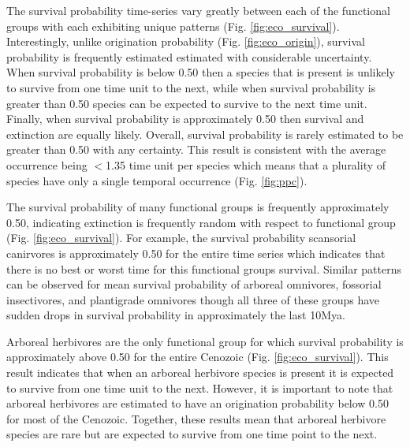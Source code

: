 \documentclass[12pt,letterpaper]{article}
\begin{document}
The survival probability time-series vary greatly between each of the functional groups with each exhibiting unique patterns (Fig. \ref{fig:eco_survival}). Interestingly, unlike origination probability (Fig. \ref{fig:eco_origin}), survival probability is frequently estimated estimated with considerable uncertainty. When survival probability is below 0.50 then a species that is present is unlikely to survive from one time unit to the next, while when survival probability is greater than 0.50 species can be expected to survive to the next time unit. Finally, when survival probability is approximately 0.50 then survival and extinction are equally likely. Overall, survival probability is rarely estimated to be greater than 0.50 with any certainty. This result is consistent with the average occurrence being \(<\)1.35 time unit per species which means that a plurality of species have only a single temporal occurrence (Fig. \ref{fig:ppc}).

The survival probability of many functional groups is frequently approximately 0.50, indicating extinction is frequently random with respect to functional group (Fig. \ref{fig:eco_survival}). For example, the survival probability scansorial canirvores is approximately 0.50 for the entire time series which indicates that there is no best or worst time for this functional groups survival. Similar patterns can be observed for mean survival probability of arboreal omnivores, fossorial insectivores, and plantigrade omnivores though all three of these groups have sudden drops in survival probability in approximately the last 10Mya.

Arboreal herbivores are the only functional group for which survival probability is approximately above 0.50 for the entire Cenozoic (Fig. \ref{fig:eco_survival}). This result indicates that when an arboreal herbivore species is present it is expected to survive from one time unit to the next. However, it is important to note that arboreal herbivores are estimated to have an origination probability below 0.50 for most of the Cenozoic. Together, these results mean that arboreal herbivore species are rare but are expected to survive from one time point to the next.
\end{document}
